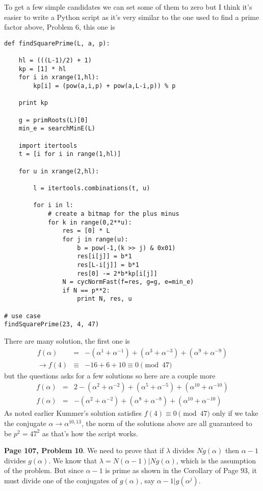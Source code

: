 \documentclass[aps,preprint,preprintnumbers,nofootinbib,showpacs,prd]{revtex4-1}
\newcommand{\nbea}{\begin{eqnarray*}}
\newcommand{\neea}{\end{eqnarray*}}
\begin{document}
To get a few simple candidates we can set some of them to zero but I think it's easier to write a Python script as it's very similar to the one used to find a prime factor above, Problem 6, this one is
%
\begin{Verbatim}[baselinestretch=0.75]
def findSquarePrime(L, a, p):
    
    hl = (((L-1)/2) + 1)
    kp = [1] * hl
    for i in xrange(1,hl):
        kp[i] = (pow(a,i,p) + pow(a,L-i,p)) % p

    print kp

    g = primRoots(L)[0]
    min_e = searchMinE(L)
    
    import itertools
    t = [i for i in range(1,hl)]
    
    for u in xrange(2,hl):
        
        l = itertools.combinations(t, u)

        for i in l:
            # create a bitmap for the plus minus
            for k in range(0,2**u):
                res = [0] * L
                for j in range(u):
                    b = pow(-1,(k >> j) & 0x01)
                    res[i[j]] = b*1
                    res[L-i[j]] = b*1
                    res[0] -= 2*b*kp[i[j]]
                N = cycNormFast(f=res, g=g, e=min_e)
                if N == p**2:
                    print N, res, u
                    
# use case
findSquarePrime(23, 4, 47)
\end{Verbatim}
%
There are many solution, the first one is
%
\nbea
f(\alpha) & = & -(\alpha^{1} + \alpha^{-1}) + (\alpha^{3} + \alpha^{-3}) + (\alpha^{9} + \alpha^{-9}) \\
\to f(4) & \equiv & -16 + 6 + 10 \equiv 0 \pmod{47} 
\neea
%
but the questions asks for a few solutions so here are a couple more
%
\nbea
f(\alpha) & = & 2 - (\alpha^{2} + \alpha^{-2}) + (\alpha^{5} + \alpha^{-5}) + (\alpha^{10} + \alpha^{-10}) \\
f(\alpha) & = & - (\alpha^{2} + \alpha^{-2}) + (\alpha^{8} + \alpha^{-8}) + (\alpha^{10} + \alpha^{-10})
\neea
%
As noted earlier Kummer's solution satisfies $f(4) \equiv 0 \pmod{47}$ only if we take the conjugate $\alpha \to \alpha^{10,13}$, the norm of the solutions above are all guaranteed to be $p^2 = 47^2$ as that's how the script works.

{\bf Page 107, Problem 10}. We need to prove that if $\lambda$ divides $Ng(\alpha)$ then $\alpha - 1$ divides $g(\alpha)$. We know that $\lambda = N(\alpha - 1) | Ng(\alpha)$, which is the assumption of the problem. But since $\alpha - 1$ is prime as shown in the Corollary of Page 93, it must divide one of the conjugates of $g(\alpha)$, say $\alpha - 1 | g(\alpha^j)$.
\end{document}
